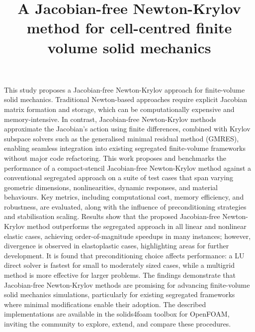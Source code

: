 \documentclass[sn-mathphys,Numbered]{sn-jnl}%
\begin{document}
\title[Article Title]{A Jacobian-free Newton-Krylov method for cell-centred finite volume solid mechanics}

\author*[1]{ }
\author[1]{ }
\author[2]{ }
\author[1,2]{ }




\abstract
{
This study proposes a Jacobian-free Newton-Krylov approach for finite-volume solid mechanics.
Traditional Newton-based approaches require explicit Jacobian matrix formation and storage, which can be computationally expensive and memory-intensive.
In contrast, Jacobian-free Newton-Krylov methods approximate the Jacobian’s action using finite differences, combined with Krylov subspace solvers such as the generalised minimal residual method (GMRES), enabling seamless integration into existing segregated finite-volume frameworks without major code refactoring.
This work proposes and benchmarks the performance of a compact-stencil Jacobian-free Newton-Krylov method against a conventional segregated approach on a suite of test cases that span varying geometric dimensions, nonlinearities, dynamic responses, and material behaviours.
Key metrics, including computational cost, memory efficiency, and robustness, are evaluated, along with the influence of preconditioning strategies and stabilisation scaling.
Results show that the proposed Jacobian-free Newton-Krylov method outperforms the segregated approach in all linear and nonlinear elastic cases, achieving order-of-magnitude speedups in many instances; however, divergence is observed in elastoplastic cases, highlighting areas for further development.
It is found that preconditioning choice affects performance: a LU direct solver is fastest for small to moderately sized cases, while a multigrid method is more effective for larger problems.
The findings demonstrate that Jacobian-free Newton-Krylov methods are promising for advancing finite-volume solid mechanics simulations, particularly for existing segregated frameworks where minimal modifications enable their adoption.
The described implementations are available in the solids4foam toolbox for OpenFOAM, inviting the community to explore, extend, and compare these procedures.
}
\end{document}
